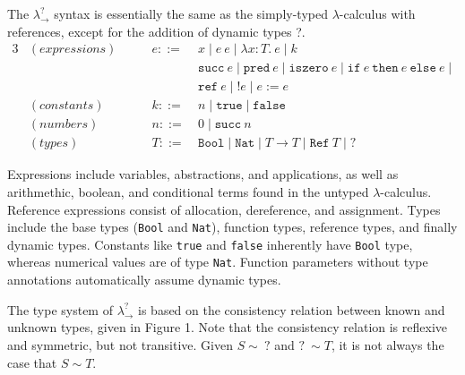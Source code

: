 The $\lambda ^? _{\rightarrow}$ syntax is essentially the same as 
the simply-typed $\lambda$-calculus with references, except for the 
addition of dynamic types ?.
\begin{alignat*}{3}
    &(\textit{expressions}) \qquad 
    & e ::= \: & x \; | \;  
          e \: e \; | \;
          \lambda x \! : \! T . \: e \; | \;
          k \\
    &&    & \texttt{succ} \: e \; | \;
          \texttt{pred} \: e \; | \;
          \texttt{iszero} \: e \; | \;
          \texttt{if} \: e \: \texttt{then} \: e \: \texttt{else} \: e \; | \; \\
    &&    & \texttt{ref} \: e \; | \;
          !e \; | \;
          e := e \\
    &(\textit{constants}) 
    & k ::= \: & n \; | \; \texttt{true} \; | \; \texttt{false} \\
    &(\textit{numbers}) 
    & n ::= \: & 0 \; | \; \texttt{succ} \: n \\
    &(\textit{types}) 
    & T ::= \: & \texttt{Bool} \; | \;
            \texttt{Nat} \; | \;
            T \rightarrow T \; | \;
            \texttt{Ref} \: T \; | \;
            ?     
\end{alignat*}

Expressions include variables, abstractions, and applications, as well as 
arithmethic, boolean, and conditional terms found in the untyped $\lambda$-calculus. 
Reference expressions consist of allocation, dereference, and assignment.
Types include the base types (\texttt{Bool} and \texttt{Nat}), function 
types, reference types, and finally dynamic types. 
Constants like \texttt{true} and \texttt{false} inherently  
have \texttt{Bool} type, whereas numerical values are of type \texttt{Nat}. 
Function parameters without type annotations automatically 
assume dynamic types. 

The type system of $\lambda ^? _{\rightarrow}$ is based on the 
consistency relation between known and unknown types, given in 
Figure 1. Note that the consistency relation is reflexive and 
symmetric, but not transitive. Given $S \sim \: ?$ and $? \: \sim T$, it 
is not always the case that $S \sim T$.  



